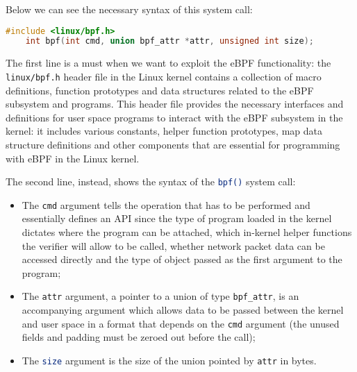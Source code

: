 Below we can see the necessary syntax of this system call:

\begin{lstlisting}[style=cstyle, language=C, caption={\colorbox{backcolour}{\lstinline[style=commandline, language=bash]|bpf()|} system call signature.}]
	#include <linux/bpf.h>
	int bpf(int cmd, union bpf_attr *attr, unsigned int size);
\end{lstlisting}

The first line is a must when we want to exploit the eBPF functionality: the \colorbox{backcolour}{\lstinline[style=commandline, language=bash, breaklines=true]|linux/bpf.h|} header file in the Linux kernel contains a collection of macro definitions, function prototypes and data structures related to the eBPF subsystem and programs. 
This header file provides the necessary interfaces and definitions for user space programs to interact with the eBPF subsystem in the kernel: it includes various constants, helper function prototypes, map data structure definitions and other components that are essential for programming with eBPF in the Linux kernel.

The second line, instead, shows the syntax of the \colorbox{backcolour}{\lstinline[style=commandline, language=bash, breaklines=true]|bpf()|} system call:

\begin{itemize}
	\item 
		The \colorbox{backcolour}{\lstinline[style=commandline, language=bash, breaklines=true]|cmd|} argument tells the operation that has to be performed and essentially defines an API since the type of program loaded in the kernel dictates where the program can be attached, which in-kernel helper functions the verifier will allow to be called, whether network packet data can be accessed directly and the type of object passed as the first argument to the program;
	\item 
		The \colorbox{backcolour}{\lstinline[style=commandline, language=bash, breaklines=true]|attr|} argument, a pointer to a union of type \colorbox{backcolour}{\lstinline[style=commandline, language=bash, breaklines=true]|bpf_attr|}, is an accompanying argument which allows data to be passed between the kernel and user space in a format that depends on the \colorbox{backcolour}{\lstinline[style=commandline, language=bash, breaklines=true]|cmd|} argument (the unused fields and padding must be zeroed out before the call);
	\item 
		The \colorbox{backcolour}{\lstinline[style=commandline, language=bash, breaklines=true]|size|} argument is the size of the union pointed by \colorbox{backcolour}{\lstinline[style=commandline, language=bash, breaklines=true]|attr|} in bytes.
\end{itemize}

